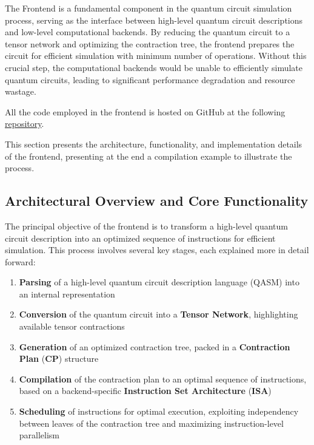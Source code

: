 \documentclass[12pt,oneside,a4paper]{article}
\begin{document}

The Frontend is a fundamental component in the quantum circuit simulation process, serving as the interface between high-level quantum circuit descriptions and low-level computational backends. By reducing the quantum circuit to a tensor network and optimizing the contraction tree, the frontend prepares the circuit for efficient simulation with minimum number of operations. Without this crucial step, the computational backends would be unable to efficiently simulate quantum circuits, leading to significant performance degradation and resource wastage.

All the code employed in the frontend is hosted on GitHub at the following \href{https://github.com/federico123579/HPPS24-Quantum-Simulation}{repository}.

This section presents the architecture, functionality, and implementation details of the frontend, presenting at the end a compilation example to illustrate the process.

\subsection{Architectural Overview and Core Functionality}

The principal objective of the frontend is to transform a high-level quantum circuit description into an optimized sequence of instructions for efficient simulation. This process involves several key stages, each explained more in detail forward:

\begin{enumerate}
    \item \textbf{Parsing} of a high-level quantum circuit description language (QASM) into an internal representation
    \item \textbf{Conversion} of the quantum circuit into a \textbf{Tensor Network}, highlighting available tensor contractions
    \item \textbf{Generation} of an optimized contraction tree, packed in a \textbf{Contraction Plan} (\textbf{CP}) structure
    \item \textbf{Compilation} of the contraction plan to an optimal sequence of instructions, based on a backend-specific \textbf{Instruction Set Architecture} (\textbf{ISA})
    \item \textbf{Scheduling} of instructions for optimal execution, exploiting independency between leaves of the contraction tree and maximizing instruction-level parallelism
\end{enumerate}
\end{document}
